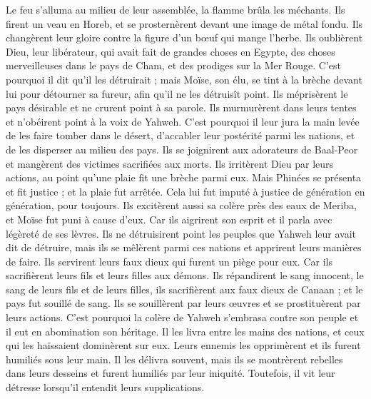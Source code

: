 \begin{multicols}{2}
Le feu s'alluma au milieu de leur assemblée, la flamme brûla les méchants.
Ils firent un veau en Horeb, et se prosternèrent devant une image de métal fondu.
Ils changèrent leur gloire contre la figure d'un bœuf qui mange l'herbe.
Ils oublièrent Dieu, leur libérateur, qui avait fait de grandes choses en Egypte,
des choses merveilleuses dans le pays de Cham, et des prodiges sur la Mer Rouge.
C'est pourquoi il dit qu'il les détruirait ; mais Moïse, son élu, se tint à la brèche devant lui pour détourner sa fureur, afin qu'il ne les détruisît point.
Ils méprisèrent le pays désirable et ne crurent point à sa parole.
Ils murmurèrent dans leurs tentes et n'obéirent point à la voix de Yahweh.
C'est pourquoi il leur jura la main levée de les faire tomber dans le désert,
d'accabler leur postérité parmi les nations, et de les disperser au milieu des pays.
Ils se joignirent aux adorateurs de Baal-Peor et mangèrent des victimes sacrifiées aux morts.
Ils irritèrent Dieu par leurs actions, au point qu'une plaie fit une brèche parmi eux.
Mais Phinées se présenta et fit justice ; et la plaie fut arrêtée.
Cela lui fut imputé à justice de génération en génération, pour toujours.
Ils excitèrent aussi sa colère près des eaux de Meriba, et Moïse fut puni à cause d'eux.
Car ils aigrirent son esprit et il parla avec légèreté de ses lèvres.
Ils ne détruisirent point les peuples que Yahweh leur avait dit de détruire,
mais ils se mêlèrent parmi ces nations et apprirent leurs manières de faire.
Ils servirent leurs faux dieux qui furent un piège pour eux.
Car ils sacrifièrent leurs fils et leurs filles aux démons.
Ils répandirent le sang innocent, le sang de leurs fils et de leurs filles, ils sacrifièrent aux faux dieux de Canaan ; et le pays fut souillé de sang.
Ils se souillèrent par leurs œuvres et se prostituèrent par leurs actions.
C'est pourquoi la colère de Yahweh s'embrasa contre son peuple et il eut en abomination son héritage.
Il les livra entre les mains des nations, et ceux qui les haïssaient dominèrent sur eux.
Leurs ennemis les opprimèrent et ils furent humiliés sous leur main.
Il les délivra souvent, mais ils se montrèrent rebelles dans leurs desseins et furent humiliés par leur iniquité.
Toutefois, il vit leur détresse lorsqu'il entendit leurs supplications.

\end{multicols}
